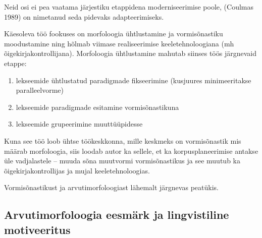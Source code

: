 \documentclass[12pt,a4paper]{article}
\begin{document}
Neid osi ei pea vaatama järjestiku etappidena moderniseerimise poole, (Coulmas 1989) on nimetanud seda pidevaks adapteerimiseks.

Käesoleva töö fookuses on morfoloogia ühtlustamine ja vormisõnastiku moodustamine ning hõlmab viimase realiseerimise keeletehnoloogiana (mh õigekirja\-kontrollijana).
Morfoloogia ühtlustamine mahutab siinses töös järgnevaid etappe:
\begin{enumerate}
\item lekseemide ühtlustatud paradigmade fikseerimine (kusjuures minimeeritakse paralleelvorme)
\item lekseemide paradigmade esitamine vormisõnastikuna
\item lekseemide grupeerimine muuttüüpidesse
\end{enumerate}

Kuna see töö loob ühtse töökeskkonna, mille keskmeks on vormisõnastik mis määrab morfoloogia, siis loodab autor ka sellele, et ka korpusplaneerimise antakse üle vadjalastele -- muuda sõna muutvormi vormisõnastikus ja see muutub ka õigekirjakontrollijas ja mujal keeletehnoloogias.

Vormisõnastikust ja arvutimorfoloogiast lähemalt järgnevas peatükis.


\subsection{Arvutimorfoloogia eesmärk ja lingvistiline motiveeritus}

\end{document}
